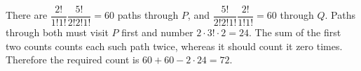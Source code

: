There are $\dfrac{2!}{1!1!}\dfrac{5!}{2!2!1!}=60$ paths through $P$, and $\dfrac{5!}{2!2!1!}\dfrac{2!}{1!1!}=60$ through $Q$. Paths through both must visit $P$ first and number $2\cdot3!\cdot2=24$. The sum of the first two counts counts each such path twice, whereas it should count it zero times. Therefore the required count is $60+60-2\cdot24=\boxed{72}$.
